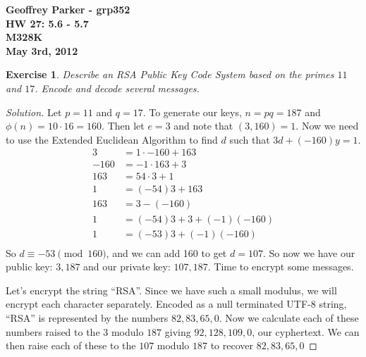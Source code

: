 \documentclass[12pt,leqno]{article}
\numberwithin{equation}{section}
\newtheorem{exer}[thm]{Exercise}
\theoremstyle{definition}
\begin{document}
\thispagestyle{plain}
\begin{flushright}
  \large{\textbf{Geoffrey Parker - grp352\\
      HW 27: 5.6 - 5.7\\
      M328K \\
      May 3rd, 2012 \\}}
\end{flushright}

\markboth{}{} \setcounter{section}{0} \baselineskip=18pt

\setcounter{tocdepth}{4}



\setcounter{section}{5}

\setcounter{thm}{5}

\begin{exer}
  Describe an RSA Public Key Code System based on the primes $11$ and
  $17$.  Encode and decode several messages.
\end{exer}
\begin{proof}[Solution]
  Let $p = 11$ and $q = 17$.  To generate our keys, $n = pq = 187$ and $\phi(n) = 10 \cdot 16 = 160$.  Then let $e = 3$ and note that $(3, 160) = 1$.  Now we need to use the Extended Euclidean Algorithm to find $d$ such that $3d + (-160)y = 1$.
  \begin{align*}
    3 &= 1 \cdot -160 + 163\\
    -160 &= -1 \cdot 163 + 3\\
    163 &= 54 \cdot 3 + 1\\
    1 &= (-54)3 + 163\\
    163 &= 3 - (-160)\\
    1 &= (-54)3 + 3 + (-1)(-160)\\
    1 &= (-53)3 + (-1)(-160)\\
  \end{align*}
  So $d \equiv -53 \pmod{160}$, and we can add 160 to get $d = 107$.  So now we have our public key: $3, 187$ and our private key: $107, 187$.  Time to encrypt some messages.
  
  Let's encrypt the string ``RSA''.  Since we have such a small modulus, we will encrypt each character separately.  Encoded as a null terminated UTF-8 string, ``RSA'' is represented by the numbers $82, 83, 65, 0$.  Now we calculate each of these numbers raised to the $3$ modulo $187$ giving $92, 128, 109, 0$, our cyphertext.  We can then raise each of these to the $107$ modulo $187$ to recover $82, 83, 65, 0$
\end{proof}
\end{document}
